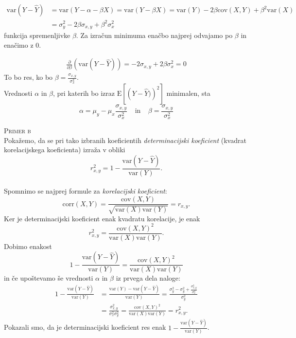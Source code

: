 \documentclass[a4paper,12pt]{article}
\begin{document}
\begin{align*} 
\text{var}(Y-\hat{Y}) &= \text{var}(Y - \alpha - \beta X) = \text{var}(Y - \beta X) = \text{var}(Y) - 2 \beta \text{cov}(X, Y) + \beta^2 \text{var}(X)
\\
&= \sigma_y^2 - 2 \beta \sigma_{x,y} + \beta^2 \sigma_x^2 
\end{align*}
funkcija spremenljivke $\beta$. Za izračun minimuma enačbo najprej odvajamo po $\beta$ in enačimo z $0$.

\begin{align*}
    \frac{\partial}{\partial \beta} (\text{var}(Y - \hat{Y})) = - 2 \sigma_{x,y} + 2 \beta \sigma_x^2 = 0 
\end{align*}
To bo res, ko bo $ \beta = \frac{\sigma_{x,y}}{\sigma_x^2} $.
\\
Vrednosti $\alpha$ in $\beta$, pri katerih bo izraz $\text{E} \left[ \left( Y - \hat{Y}) \right) ^2 \right]$ minimalen, sta
$$ \alpha = \mu_y - \mu_x \frac{\sigma_{x,y}}{\sigma_x^2} \ \ \ \ \ \text{in} \ \ \ \ \ \beta = \frac{\sigma_{x,y}}{\sigma_x^2} $$

\noindent
\textsc{Primer b}
\\
Pokažemo, da se pri tako izbranih koeficientih \textit{determinacijski koeficient} (kvadrat korelacijskega koeficienta) izraža v obliki
$$ r_{x,y}^2 = 1 - \frac{\text{var}(Y - \hat{Y})}{\text{var}(Y)}. $$
\\
Spomnimo se najprej formule za \textit{korelacijski koeficient}: 
$$ \text{corr}(X,Y) = \frac{\text{cov}(X,Y)}{\sqrt{\text{var}(X) \text{var}(Y)}} = r_{x,y}. $$
Ker je determinacijski koeficient enak kvadratu korelacije, je enak
$$ r_{x,y}^2 = \frac{\text{cov}(X,Y)^2}{\text{var}(X) \text{var}(Y)}. $$
Dobimo enakost
$$ 1 - \frac{\text{var}(Y - \hat{Y})}{\text{var}(Y)} = \frac{\text{cov}(X,Y)^2}{\text{var}(X) \text{var}(Y)} $$
in če upoštevamo še vrednosti $\alpha$ in $\beta$ iz prvega dela naloge:
\begin{align*} 
    1 - \frac{\text{var}(Y - \hat{Y})}{\text{var}(Y)} &= \frac{\text{var}(Y) - \text{var}(Y - \hat{Y})}{\text{var}(Y)} = \frac{\sigma_y^2 - \sigma_y^2 + \frac{\sigma_{x,y}^2}{\sigma_x^2}}{\sigma_y^2} 
    \\
    &= \frac{\sigma_{x,y}^2}{\sigma_x^2 \sigma_y^2} = \frac{\text{cov}(X,Y)^2}{\text{var}(X) \text{var}(Y)} = r_{x,y}^2. 
\end{align*}
Pokazali smo, da je determinacijski koeficient res enak $1 - \frac{\text{var}(Y - \hat{Y})}{\text{var}(Y)}$.
\end{document}
